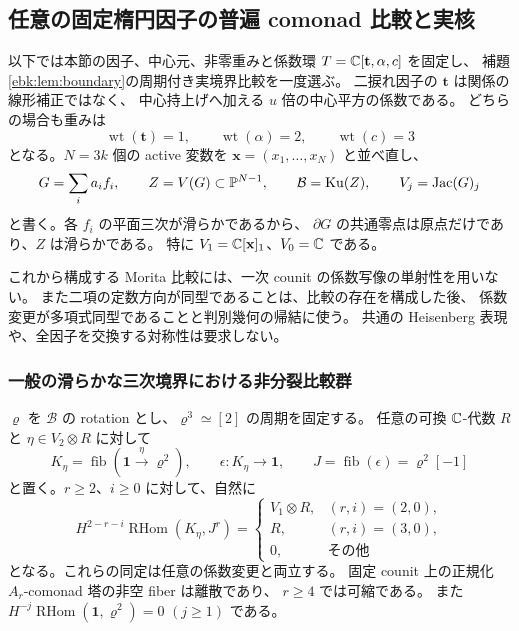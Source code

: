 \subsection{任意の固定楕円因子の普遍 comonad 比較と実核}
\label{euk:subsec:universal-kernel}

以下では本節の因子、中心元、非零重みと係数環
$T=\mathbb C[\mathbf t,\alpha,c]$ を固定し、
補題\ref{ebk:lem:boundary}の周期付き実境界比較を一度選ぶ。
二捩れ因子の $\mathbf t$ は関係の線形補正ではなく、
中心持上げへ加える $u$ 倍の中心平方の係数である。
どちらの場合も重みは
\[
 \operatorname{wt}(\mathbf t)=1,\qquad
 \operatorname{wt}(\alpha)=2,\qquad \operatorname{wt}(c)=3
\]
となる。$N=3k$ 個の active 変数を $\mathbf x=(x_1,\ldots,x_N)$ と並べ直し、
\[
 G=\sum_i a_if_i,\qquad Z=V(G)\subset\mathbb P^{N-1},\qquad
 \mathcal B=\operatorname{Ku}(Z),\qquad V_j=\operatorname{Jac}(G)_j
\]
と書く。各 $f_i$ の平面三次が滑らかであるから、
$\partial G$ の共通零点は原点だけであり、$Z$ は滑らかである。
特に $V_1=\mathbb C[\mathbf x]_1$、$V_0=\mathbb C$ である。

これから構成する Morita 比較には、一次 counit の係数写像の単射性を用いない。
また二項の定数方向が同型であることは、比較の存在を構成した後、
係数変更が多項式同型であることと判別幾何の帰結に使う。
共通の Heisenberg 表現や、全因子を交換する対称性は要求しない。

\subsubsection{一般の滑らかな三次境界における非分裂比較群}

\begin{lemma}[因子の方程式に依存しない正規化塔]
\label{euk:lem:arity}
$\varrho$ を $\mathcal B$ の rotation とし、$\varrho^3\simeq[2]$ の周期を固定する。
任意の可換 $\mathbb C$-代数 $R$ と $\eta\in V_2\otimes R$ に対して
\[
 K_\eta=\operatorname{fib}(\mathbf1\xrightarrow{\eta}\varrho^2),
 \qquad \epsilon:K_\eta\to\mathbf1,
 \qquad J=\operatorname{fib}(\epsilon)=\varrho^2[-1]
\]
と置く。$r\ge2$、$i\ge0$ に対して、自然に
\begin{equation}\label{euk:eq:arity}
 H^{2-r-i}\operatorname{RHom}(K_\eta,J^r)=
 \begin{cases}
  V_1\otimes R,&(r,i)=(2,0),\\
  R,&(r,i)=(3,0),\\
  0,&\text{その他}
 \end{cases}
\end{equation}
となる。これらの同定は任意の係数変更と両立する。
固定 counit 上の正規化 $A_r$-comonad 塔の非空 fiber は離散であり、
$r\ge4$ では可縮である。
また $H^{-j}\operatorname{RHom}(\mathbf1,\varrho^2)=0$ $(j\ge1)$ である。
\end{lemma}

